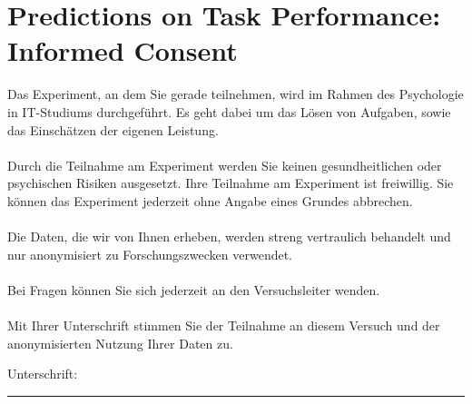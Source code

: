 \documentclass[color=9c]{tudaexercise}
\begin{document}
\section*{Predictions on Task Performance: Informed Consent}

\noindent Das Experiment, an dem Sie gerade teilnehmen, wird im Rahmen des Psychologie in IT-Studiums durchgeführt. Es geht dabei um das Lösen von Aufgaben, sowie das Einschätzen der eigenen Leistung.\\\\
Durch die Teilnahme am Experiment werden Sie keinen gesundheitlichen oder psychischen Risiken ausgesetzt.
Ihre Teilnahme am Experiment ist freiwillig. Sie können das Experiment jederzeit ohne Angabe eines Grundes abbrechen.\\\\
Die Daten, die wir von Ihnen erheben, werden streng vertraulich behandelt und nur anonymisiert zu Forschungszwecken verwendet.\\\\
Bei Fragen können Sie sich jederzeit an den Versuchsleiter wenden.\\\\
Mit Ihrer Unterschrift stimmen Sie der Teilnahme an diesem Versuch und der anonymisierten Nutzung Ihrer Daten zu.

\vspace{0.7cm}

\noindent Unterschrift: \rule{4cm}{1pt}

\vspace{0.7cm}
\end{document}

